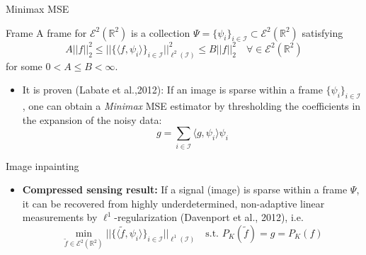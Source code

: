 \begin{frame}{Minimax MSE}

\begin{block}{Frame}
A frame for $\mathcal{E}^2(\mathbb{R}^2)$ is a collection $\Psi=\{\psi_i\}_{i\in\mathcal{I}}\subset\mathcal{E}^2(\mathbb{R}^2)$ satisfying
$$
A ||f||_2^2\leq ||\{\langle f,\psi_i\rangle\}_{i\in\mathcal{I}}||^2_{\ell^2(\mathcal{I})}\leq B||f||_2^2 \quad \forall\in \mathcal{E}^2(\mathbb{R}^2)
$$
for some $0<A\leq B<\infty$.
\end{block}

\pause

\begin{itemize}
\bigskip

\bigskip
\item It is proven (Labate et al.,2012): If an image is sparse within a frame $\{\psi_i\}_{i\in \mathcal{I}}$, one can obtain a \textit{Minimax} MSE estimator by thresholding the coefficients in the expansion of the noisy data:
$$
g = \sum_{i\in\mathcal{I}}\langle g,\psi_i\rangle\psi_i
$$
\end{itemize}
\end{frame}

\begin{frame}{Image inpainting}

\begin{itemize}

\begin{block}{\textbf{Goal}}
 Recover an image $f\in \mathcal{E}^2(\mathbb{R}^2)$ from known data:
$$
g = P_K(f)
$$
where $P_K$ is and orthogonal projection onto the known subspace $(\mathcal{E}^2(\mathbb{R}^2))_K$.
\end{block}

\pause
\bigskip

\item  \textbf{Compressed sensing result:} If a signal (image) is sparse within a frame $\Psi$, it can be recovered from highly underdetermined, non-adaptive linear measurements by $\ell^1$-regularization (Davenport et al., 2012), i.e.
$$
\min_{\tilde{f}\in \mathcal{E}^2(\mathbb{R}^2)}||\{\langle\tilde{f},\psi_i\rangle\}_{i\in\mathcal{I}}||_{\ell^1(\mathcal{I})} \quad \text{s.t. }P_K(\tilde{f})=g=P_K(f)
$$

\end{itemize}

\end{frame}

